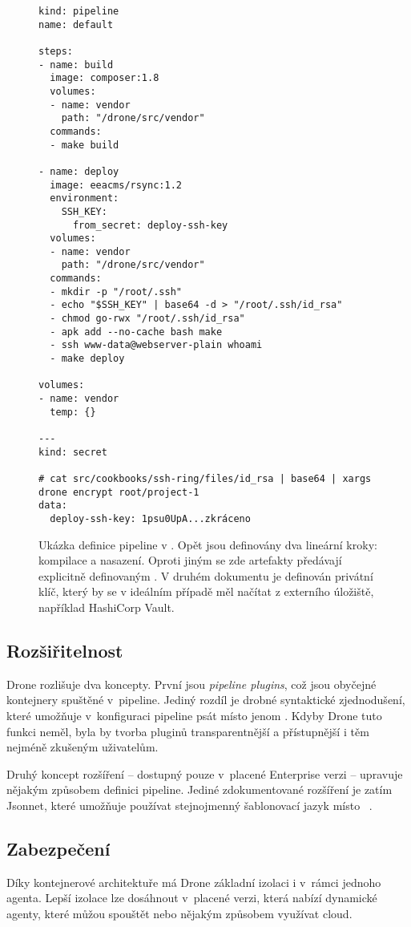     \begin{figure}[H]
        \centering
        \begin{verbatim}
kind: pipeline
name: default

steps:
- name: build
  image: composer:1.8
  volumes:
  - name: vendor
    path: "/drone/src/vendor"
  commands:
  - make build

- name: deploy
  image: eeacms/rsync:1.2
  environment:
    SSH_KEY:
      from_secret: deploy-ssh-key
  volumes:
  - name: vendor
    path: "/drone/src/vendor"
  commands:
  - mkdir -p "/root/.ssh"
  - echo "$SSH_KEY" | base64 -d > "/root/.ssh/id_rsa"
  - chmod go-rwx "/root/.ssh/id_rsa"
  - apk add --no-cache bash make
  - ssh www-data@webserver-plain whoami
  - make deploy

volumes:
- name: vendor
  temp: {}

---
kind: secret

# cat src/cookbooks/ssh-ring/files/id_rsa | base64 | xargs drone encrypt root/project-1
data:
  deploy-ssh-key: 1psu0UpA...zkráceno
        \end{verbatim}
        \caption{Ukázka definice pipeline v . Opět jsou definovány dva lineární kroky: kompilace a nasazení. Oproti jiným \CI se zde artefakty předávají explicitně definovaným . V druhém dokumentu je definován privátní klíč, který by se v ideálním případě měl načítat z externího úložiště, například HashiCorp Vault.}
    \end{figure}

    \subsection{Rozšiřitelnost}
        Drone rozlišuje dva koncepty. První jsou \textit{pipeline plugins}, což jsou obyčejné kontejnery spuštěné v~pipeline. Jediný rozdíl je drobné syntaktické zjednodušení, které umožňuje v~konfiguraci pipeline psát místo  jenom . Kdyby Drone tuto funkci neměl, byla by tvorba pluginů transparentnější a přístupnější i těm nejméně zkušeným uživatelům.

        Druhý koncept rozšíření -- dostupný pouze v~placené Enterprise verzi -- upravuje nějakým způsobem definici pipeline. Jediné zdokumentované rozšíření je zatím Jsonnet, které umožňuje používat stejnojmenný šablonovací jazyk místo ~\cite{drone-jsonnet}.

    \subsection{Zabezpečení}
        Díky kontejnerové architektuře má Drone základní izolaci i v~rámci jednoho agenta. Lepší izolace lze dosáhnout v~placené verzi, která nabízí dynamické agenty, které můžou spouštět  nebo nějakým způsobem využívat cloud.

